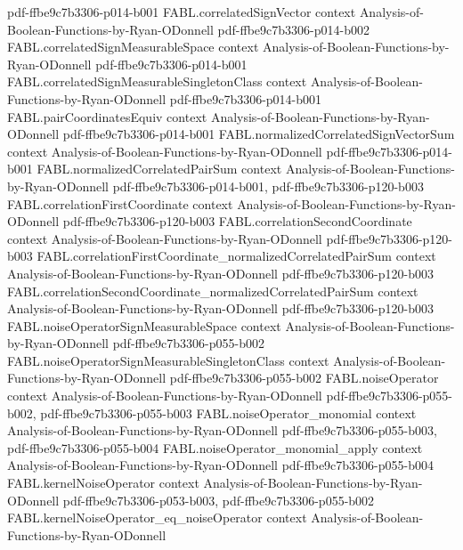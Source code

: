 \begin{theorem}
  {pdf-ffbe9c7b3306-p014-b001}
\proofstep
  {FABL.correlatedSignVector}
  {context}
  {Analysis-of-Boolean-Functions-by-Ryan-ODonnell}
  {pdf-ffbe9c7b3306-p014-b002}
\proofstep
  {FABL.correlatedSignMeasurableSpace}
  {context}
  {Analysis-of-Boolean-Functions-by-Ryan-ODonnell}
  {pdf-ffbe9c7b3306-p014-b001}
\proofstep
  {FABL.correlatedSignMeasurableSingletonClass}
  {context}
  {Analysis-of-Boolean-Functions-by-Ryan-ODonnell}
  {pdf-ffbe9c7b3306-p014-b001}
\proofstep
  {FABL.pairCoordinatesEquiv}
  {context}
  {Analysis-of-Boolean-Functions-by-Ryan-ODonnell}
  {pdf-ffbe9c7b3306-p014-b001}
\proofstep
  {FABL.normalizedCorrelatedSignVectorSum}
  {context}
  {Analysis-of-Boolean-Functions-by-Ryan-ODonnell}
  {pdf-ffbe9c7b3306-p014-b001}
\proofstep
  {FABL.normalizedCorrelatedPairSum}
  {context}
  {Analysis-of-Boolean-Functions-by-Ryan-ODonnell}
  {pdf-ffbe9c7b3306-p014-b001,
    pdf-ffbe9c7b3306-p120-b003}
\proofstep
  {FABL.correlationFirstCoordinate}
  {context}
  {Analysis-of-Boolean-Functions-by-Ryan-ODonnell}
  {pdf-ffbe9c7b3306-p120-b003}
\proofstep
  {FABL.correlationSecondCoordinate}
  {context}
  {Analysis-of-Boolean-Functions-by-Ryan-ODonnell}
  {pdf-ffbe9c7b3306-p120-b003}
\proofstep
  {FABL.correlationFirstCoordinate_normalizedCorrelatedPairSum}
  {context}
  {Analysis-of-Boolean-Functions-by-Ryan-ODonnell}
  {pdf-ffbe9c7b3306-p120-b003}
\proofstep
  {FABL.correlationSecondCoordinate_normalizedCorrelatedPairSum}
  {context}
  {Analysis-of-Boolean-Functions-by-Ryan-ODonnell}
  {pdf-ffbe9c7b3306-p120-b003}
\proofstep
  {FABL.noiseOperatorSignMeasurableSpace}
  {context}
  {Analysis-of-Boolean-Functions-by-Ryan-ODonnell}
  {pdf-ffbe9c7b3306-p055-b002}
\proofstep
  {FABL.noiseOperatorSignMeasurableSingletonClass}
  {context}
  {Analysis-of-Boolean-Functions-by-Ryan-ODonnell}
  {pdf-ffbe9c7b3306-p055-b002}
\proofstep
  {FABL.noiseOperator}
  {context}
  {Analysis-of-Boolean-Functions-by-Ryan-ODonnell}
  {pdf-ffbe9c7b3306-p055-b002,
    pdf-ffbe9c7b3306-p055-b003}
\proofstep
  {FABL.noiseOperator_monomial}
  {context}
  {Analysis-of-Boolean-Functions-by-Ryan-ODonnell}
  {pdf-ffbe9c7b3306-p055-b003,
    pdf-ffbe9c7b3306-p055-b004}
\proofstep
  {FABL.noiseOperator_monomial_apply}
  {context}
  {Analysis-of-Boolean-Functions-by-Ryan-ODonnell}
  {pdf-ffbe9c7b3306-p055-b004}
\proofstep
  {FABL.kernelNoiseOperator}
  {context}
  {Analysis-of-Boolean-Functions-by-Ryan-ODonnell}
  {pdf-ffbe9c7b3306-p053-b003,
    pdf-ffbe9c7b3306-p055-b002}
\proofstep
  {FABL.kernelNoiseOperator_eq_noiseOperator}
  {context}
  {Analysis-of-Boolean-Functions-by-Ryan-ODonnell}

\end{theorem}
